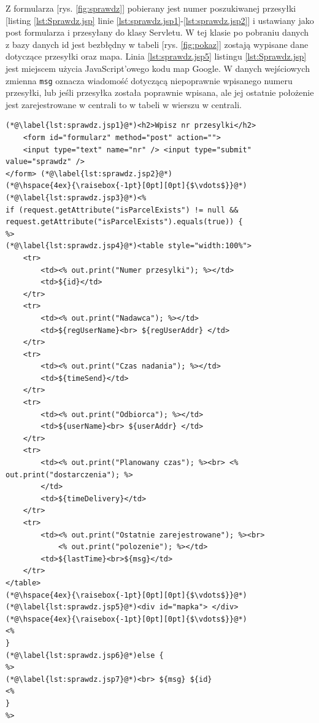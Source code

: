 \documentclass[eng,printmode,oneside]{mgr}
\begin{document}
Z formularza [rys. \ref{fig:sprawdz}] pobierany jest numer poszukiwanej
przesyłki [listing \ref{lst:Sprawdz.jsp} linie
\ref{lst:sprawdz.jsp1}-\ref{lst:sprawdz.jsp2}] i ustawiany jako post formularza
i przesyłany do klasy Servletu. W tej klasie po pobraniu danych z bazy danych
  
 id jest bezbłędny w tabeli [rys.
\ref{fig:pokaz}] zostają wypisane dane dotyczące przesyłki oraz mapa. Linia
\ref{lst:sprawdz.jsp5} listingu \ref{lst:Sprawdz.jsp} jest miejscem użycia
JavaScript'owego kodu map Google. W danych wejściowych zmienna \texttt{msg}
oznacza wiadomość dotyczącą niepoprawnie wpisanego numeru przesyłki, lub jeśli
przesyłka została poprawnie wpisana, ale jej ostatnie położenie jest
zarejestrowane w centrali to w tabeli w wierszu
 w centrali.

\begin{lstlisting}[caption=Ciało pliku JavaServlet Pages -
sprawdz.jsp,label=lst:Sprawdz.jsp] 
(*@\label{lst:sprawdz.jsp1}@*)<h2>Wpisz nr przesylki</h2> 
	<form id="formularz" method="post" action=""> 
	<input type="text" name="nr" /> <input type="submit" value="sprawdz" />
</form> (*@\label{lst:sprawdz.jsp2}@*)
(*@\hspace{4ex}{\raisebox{-1pt}[0pt][0pt]{$\vdots$}}@*)
(*@\label{lst:sprawdz.jsp3}@*)<%
if (request.getAttribute("isParcelExists") != null &&
request.getAttribute("isParcelExists").equals(true)) {
%>
(*@\label{lst:sprawdz.jsp4}@*)<table style="width:100%">
	<tr>
		<td><% out.print("Numer przesylki"); %></td>
		<td>${id}</td>
	</tr>
	<tr>
		<td><% out.print("Nadawca"); %></td>
		<td>${regUserName}<br> ${regUserAddr} </td>
	</tr>
	<tr>
		<td><% out.print("Czas nadania"); %></td>
		<td>${timeSend}</td>
	</tr>
	<tr>
		<td><% out.print("Odbiorca"); %></td>
		<td>${userName}<br> ${userAddr} </td>
	</tr>
	<tr>
		<td><% out.print("Planowany czas"); %><br> <% out.print("dostarczenia"); %>
		</td>
		<td>${timeDelivery}</td>
	</tr>
	<tr>
		<td><% out.print("Ostatnie zarejestrowane"); %><br>
			<% out.print("polozenie"); %></td>
		<td>${lastTime}<br>${msg}</td>
	</tr>
</table>
(*@\hspace{4ex}{\raisebox{-1pt}[0pt][0pt]{$\vdots$}}@*)
(*@\label{lst:sprawdz.jsp5}@*)<div id="mapka"> </div>
(*@\hspace{4ex}{\raisebox{-1pt}[0pt][0pt]{$\vdots$}}@*)
<%
}
(*@\label{lst:sprawdz.jsp6}@*)else {
%>
(*@\label{lst:sprawdz.jsp7}@*)<br> ${msg} ${id}
<% 
}
%>
\end{lstlisting}
\end{document}
